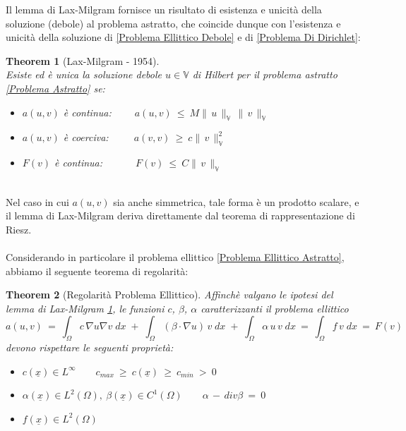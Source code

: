 \documentclass[12pt,a4paper]{report}
\theoremstyle{theorem}
\newtheorem{theorem}{Theorem}[section]
\theoremstyle{theorem}
\theoremstyle{definition}
\providecommand{\norm}[1]{\lVert \, #1 \, \rVert}
\begin{document}
Il lemma di Lax-Milgram fornisce un risultato di esistenza e unicità della soluzione (debole) al problema astratto, che coincide dunque con l'esistenza e unicità della soluzione di \ref{Problema Ellittico Debole} e di \ref{Problema Di Dirichlet}:
\begin{theorem} [Lax-Milgram - 1954]  \label{Lemma di Lax-Milgram}
\hfill \\
Esiste ed è unica la soluzione debole $u \in \mathbb{V}$ di Hilbert per il problema astratto \ref{Problema Astratto} se:
\begin{itemize}
	\item $a(u,v)$ è continua: $\qquad a(u,v) \ \leq \ M \norm{u}_{\mathbb{V}} \, \norm{v}_{\mathbb{V}}$
	\item $a(u,v)$ è coerciva: $\qquad \ a(v,v) \ \geq \ c \norm{v}_{\mathbb{V}}^{2}$
	\item $F(v)$ è continua: $\qquad \quad F(v) \ \leq \ C \norm{v}_{\mathbb{V}}$
\end{itemize}
\end{theorem}
\hfill \\
Nel caso in cui $a(u,v)$ sia anche simmetrica, tale forma è un prodotto scalare, e il lemma di Lax-Milgram deriva direttamente dal teorema di rappresentazione di Riesz. \\
\hfill \\
Considerando in particolare il problema ellittico \ref{Problema Ellittico Astratto}, abbiamo il seguente teorema di regolarità:
\begin{theorem}[Regolarità Problema Ellittico]
Affinchè valgano le ipotesi del lemma di Lax-Milgram \ref{Lemma di Lax-Milgram}, le funzioni $c$, $\beta$, $\alpha$ caratterizzanti il problema ellittico
\[ a(u,v) \ = \ \int_{\Omega}{c \, \nabla u \nabla v \; dx} \; + \; \int_{\Omega}{(\beta \cdot \nabla u) \, v \; dx} \; + \; \int_{\Omega}{\alpha \, u \, v \; dx} \ = \ \int_{\Omega}{f \, v \; dx} \ = \ F(v) \]
devono rispettare le seguenti proprietà:
\begin{itemize}
	\item $c(\underline{x}) \in L^{\infty} \qquad c_{max} \ \geq \ c(\underline{x}) \ \geq \ c_{min} \ > \ 0 $
	\item $\alpha(\underline{x}) \in L^{2}(\Omega), \ \beta(\underline{x}) \in C^{1}(\Omega) \qquad \alpha \, - \, div \beta \ = \ 0$
	\item $f(\underline{x}) \in L^{2}(\Omega)$
\end{itemize}
\end{theorem}
\end{document}
